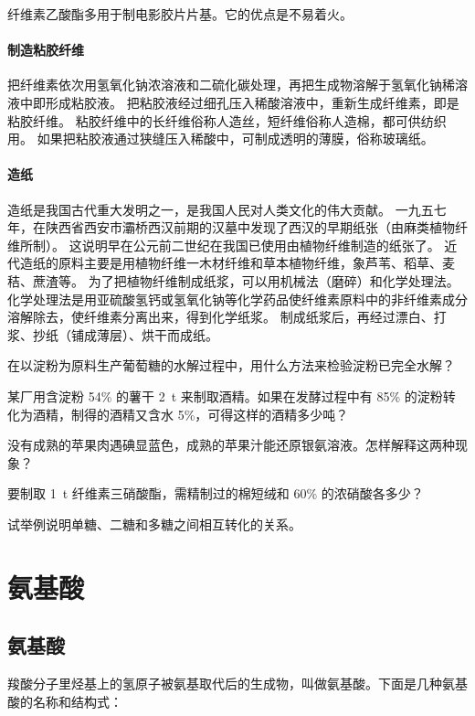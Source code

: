 纤维素乙酸酯多用于制电影胶片片基。它的优点是不易着火。

\paragraph{制造粘胶纤维}\mbox{}\par
把纤维素依次用氢氧化钠浓溶液和二硫化碳处理，再把生成物溶解于氢氧化钠稀溶液中即形成粘胶液。
把粘胶液经过细孔压入稀酸溶液中，重新生成纤维素，即是粘胶纤维。
粘胶纤维中的长纤维俗称人造丝，短纤维俗称人造棉，都可供纺织用。
如果把粘胶液通过狭缝压入稀酸中，可制成透明的薄膜，俗称玻璃纸。

\paragraph{造纸}\mbox{}\par
造纸是我国古代重大发明之一，是我国人民对人类文化的伟大贡献。
一九五七年，在陕西省西安市灞桥西汉前期的汉墓中发现了西汉的早期纸张（由麻类植物纤维所制）。
这说明早在公元前二世纪在我国已使用由植物纤维制造的纸张了。
近代造纸的原料主要是用植物纤维一木材纤维和草本植物纤维，象芦苇、稻草、麦秸、蔗渣等。
为了把植物纤维制成纸浆，可以用机械法（磨碎）和化学处理法。
化学处理法是用亚硫酸氢钙或氢氧化钠等化学药品使纤维素原料中的非纤维素成分溶解除去，使纤维素分离出来，得到化学纸浆。
制成纸浆后，再经过漂白、打浆、抄纸（铺成薄层）、烘干而成纸。

\begin{Practice}[习题]
\begin{question}
  \item 在以淀粉为原料生产葡萄糖的水解过程中，用什么方法来检验淀粉已完全水解？
  \item 某厂用含淀粉 54\% 的薯干 \qty{2}{t} 来制取酒精。如果在发酵过程中有 85\% 的淀粉转化为酒精，制得的酒精又含水 5\%，可得这样的酒精多少吨？
  \item 没有成熟的苹果肉遇碘显蓝色，成熟的苹果汁能还原银氨溶液。怎样解释这两种现象？
  \item 要制取 \qty{1}{t} 纤维素三硝酸酯，需精制过的棉短绒和 60\% 的浓硝酸各多少？
  \item 试举例说明单糖、二糖和多糖之间相互转化的关系。
\end{question}
\end{Practice}

\section{氨基酸}
\subsection{氨基酸}
羧酸分子里烃基上的氢原子被氨基取代后的生成物，叫做氨基酸。下面是几种氨基酸的名称和结构式：

